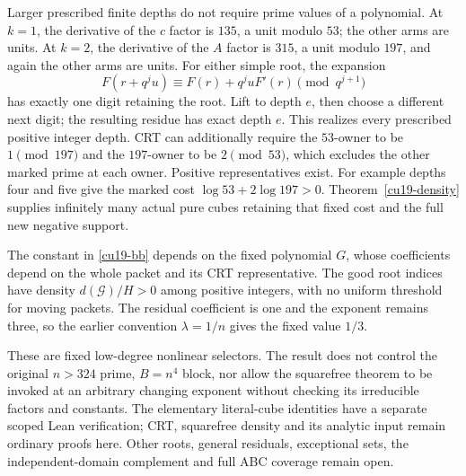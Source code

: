Larger prescribed finite depths do not require prime values of a
polynomial. At \(k=1\), the derivative of the \(c\) factor is \(135\),
a unit modulo \(53\); the other arms are units. At \(k=2\), the
derivative of the \(A\) factor is \(315\), a unit modulo \(197\),
and again the other arms are units. For either simple root, the
expansion
\[
 F(r+q^j u)\equiv F(r)+q^j uF'(r)\pmod{q^{j+1}}
\]
has exactly one digit retaining the root. Lift to depth \(e\), then
choose a different next digit; the resulting residue has exact
depth \(e\). This realizes every prescribed positive integer
depth. CRT can additionally require the \(53\)-owner to be
\(1\pmod{197}\) and the \(197\)-owner to be \(2\pmod{53}\),
which excludes the other marked prime at each owner. Positive
representatives exist. For example depths four and five give
the marked cost \(\log53+2\log197>0\).
Theorem~\ref{cu19-density} supplies infinitely many actual pure
cubes retaining that fixed cost and the full new negative support.

The constant in \eqref{cu19-bb} depends on the fixed polynomial
\(G\), whose coefficients depend on the whole packet and its CRT
representative. The good root indices have density
\(d(\mathcal G)/H>0\) among positive integers, with no uniform
threshold for moving packets. The residual coefficient is one
and the exponent remains three, so the earlier convention
\(\lambda=1/n\) gives the fixed value \(1/3\).

These are fixed low-degree nonlinear selectors. The result does
not control the original \(n>324\) prime, \(B=n^4\) block, nor
allow the squarefree theorem to be invoked at an arbitrary changing
exponent without checking its irreducible factors and constants.
The elementary literal-cube identities have a separate scoped
Lean verification; CRT, squarefree density and its analytic input
remain ordinary proofs here. Other roots, general residuals,
exceptional sets, the independent-domain complement and full ABC
coverage remain open.
